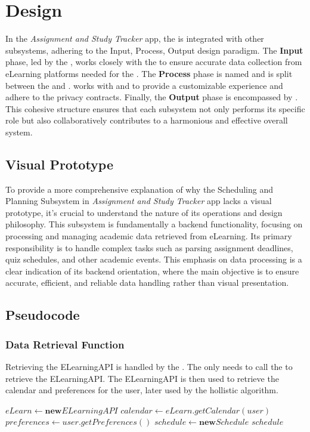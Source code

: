\documentclass[12pt]{article}
\newcommand\app{\textit{Assignment and Study Tracker} app\xspace}
\begin{document}
\section{Design}
In the \app, the \subsystem is integrated with other subsystems, adhering to the Input, Process, Output design paradigm. The \textbf{Input} phase, led by the \dataRetrieval, works closely with the \dataSubsystem to ensure accurate data collection from eLearning platforms needed for the \scheduler. The \textbf{Process} phase is named \scheduler and is split between the \persoanlizedScheduler and \dynamicScheduler. \persoanlizedScheduler works with \securitySubsystem and \userSubsystem to provide a customizable experience and adhere to the privacy contracts. Finally, the \textbf{Output} phase is encompassed by \userInterface. This cohesive structure ensures that each subsystem not only performs its specific role but also collaboratively contributes to a harmonious and effective overall system.

\subsection{Visual Prototype}
To provide a more comprehensive explanation of why the Scheduling and Planning Subsystem in \app lacks a visual prototype, it's crucial to understand the nature of its operations and design philosophy. This subsystem is fundamentally a backend functionality, focusing on processing and managing academic data retrieved from eLearning. Its primary responsibility is to handle complex tasks such as parsing assignment deadlines, quiz schedules, and other academic events. This emphasis on data processing is a clear indication of its backend orientation, where the main objective is to ensure accurate, efficient, and reliable data handling rather than visual presentation.

\newpage

\subsection{Pseudocode}

\subsubsection{Data Retrieval Function}
Retrieving the ELearningAPI is handled by the \dataSubsystem. The \subsystem only needs to call the \dataSubsystem to retrieve the ELearningAPI. The ELearningAPI is then used to retrieve the calendar and preferences for the user, later used by the hollistic algorithm.
\begin{algorithmic}[1] %
    \State $eLearn \gets \textbf{new} ELearningAPI$
    \State $calendar \gets eLearn.getCalendar(user)$
    \State $preferences \gets user.getPreferences()$
    \State $schedule \gets \textbf{new} Schedule$
    \State {}
    \State {}
    \State \Return $schedule$
\EndFunction
\Statex

\end{algorithmic}
\end{document}
